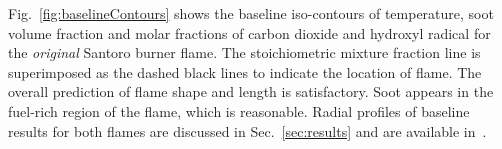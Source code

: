 \documentclass[12pt]{CHT-20}
\begin{document}
Fig.~\ref{fig:baselineContours} shows the baseline iso-contours of temperature, soot volume fraction and molar fractions of carbon dioxide and hydroxyl radical for the \emph{original} Santoro burner flame. The stoichiometric mixture fraction line is superimposed as the dashed black lines to indicate the location of flame. The overall prediction of flame shape and length is satisfactory. Soot appears in the fuel-rich region of the flame, which is reasonable. Radial profiles of baseline results for both flames are discussed in Sec.~\ref{sec:results} and are available in~\citep[]{Squeo2021}.
\end{document}
